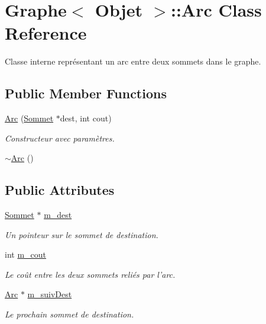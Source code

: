 \hypertarget{class_graphe_1_1_arc}{
\section{Graphe$<$ Objet $>$::Arc Class Reference}
\label{class_graphe_1_1_arc}
}


Classe interne représentant un arc entre deux sommets dans le graphe.  


\subsection*{Public Member Functions}
\begin{DoxyCompactItemize}
\item 
\hyperlink{class_graphe_1_1_arc_a3b485959423829dcc2ba7f5c1092a456}{Arc} (\hyperlink{class_graphe_1_1_sommet}{Sommet} $\ast$dest, int cout)
\begin{DoxyCompactList}\small\item\em Constructeur avec paramètres. \end{DoxyCompactList}\item 
\hyperlink{class_graphe_1_1_arc_a775ea7fc101c2f8a45419f5a3be58166}{$\sim$Arc} ()
\end{DoxyCompactItemize}
\subsection*{Public Attributes}
\begin{DoxyCompactItemize}
\item 
\hyperlink{class_graphe_1_1_sommet}{Sommet} $\ast$ \hyperlink{class_graphe_1_1_arc_a9d1f11eb639df5e712b859b95d8c6d15}{m\_\-dest}
\begin{DoxyCompactList}\small\item\em Un pointeur sur le sommet de destination. \end{DoxyCompactList}\item 
int \hyperlink{class_graphe_1_1_arc_a7db3231570655fd43acc6be1a228b74c}{m\_\-cout}
\begin{DoxyCompactList}\small\item\em Le coût entre les deux sommets reliés par l'arc. \end{DoxyCompactList}\item 
\hyperlink{class_graphe_1_1_arc}{Arc} $\ast$ \hyperlink{class_graphe_1_1_arc_a48a25d83dfc9f2230050c40939a1cbe9}{m\_\-suivDest}
\begin{DoxyCompactList}\small\item\em Le prochain sommet de destination. \end{DoxyCompactList}\end{DoxyCompactItemize}


